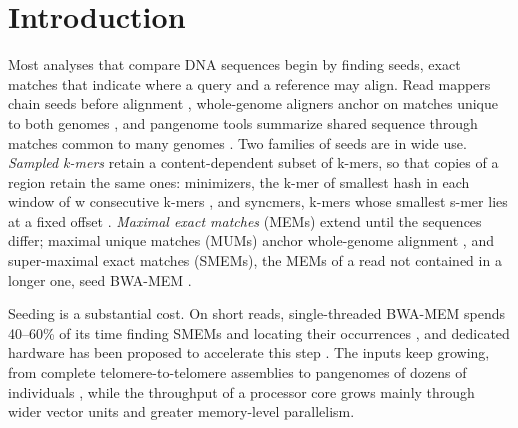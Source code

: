 \section{Introduction}

Most analyses that compare DNA sequences begin by finding seeds, exact matches that indicate where a query and a reference may align. Read mappers chain seeds before alignment \citep{Li2013,Li2018}, whole-genome aligners anchor on matches unique to both genomes \citep{Delcher1999,Marcais2018}, and pangenome tools summarize shared sequence through matches common to many genomes \citep{Shivakumar2025}. Two families of seeds are in wide use. \emph{Sampled k-mers} retain a content-dependent subset of k-mers, so that copies of a region retain the same ones: minimizers, the k-mer of smallest hash in each window of w consecutive k-mers \citep{Schleimer2003,Roberts2004}, and syncmers, k-mers whose smallest s-mer lies at a fixed offset \citep{Edgar2021}. \emph{Maximal exact matches} (MEMs) extend until the sequences differ; maximal unique matches (MUMs) anchor whole-genome alignment \citep{Delcher1999}, and super-maximal exact matches (SMEMs), the MEMs of a read not contained in a longer one, seed BWA-MEM \citep{Li2012,Li2013}.

Seeding is a substantial cost. On short reads, single-threaded BWA-MEM spends 40--60\% of its time finding SMEMs and locating their occurrences \citep{Vasimuddin2019}, and dedicated hardware has been proposed to accelerate this step \citep{Subramaniyan2021}. The inputs keep growing, from complete telomere-to-telomere assemblies \citep{Nurk2022} to pangenomes of dozens of individuals \citep{Liao2023}, while the throughput of a processor core grows mainly through wider vector units and greater memory-level parallelism.

